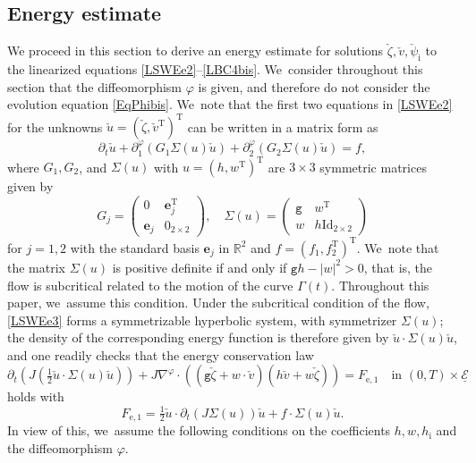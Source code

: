 \documentclass[10pt]{amsart}
\newcommand{\gr}{{\mathtt g}}
\newcommand{\R}{{\mathbb R}}
\newcommand{\dt}{\partial_t}
\newcommand{\cE}{{\mathcal E}}
\newcommand{\ul}[1]{\underline{#1}}
\newcommand{\itGamma}{\mathit{\Gamma}}
\theoremstyle{definition}
\begin{document}
\subsection{Energy estimate}
We proceed in this section to derive an energy estimate for solutions $\check{\zeta},\check{v},\check{\psi}_\mathrm{i}$ to the linearized equations
\eqref{LSWEe2}--\eqref{LBC4bis}. We~consider throughout this section that the diffeomorphism $\varphi$ is given, and therefore do not consider the evolution equation \eqref{EqPhibis}. We~note that the first two equations in \eqref{LSWEe2} for the unknowns $\check{u}=(\check{\zeta},\check{v}^\mathrm{T})^\mathrm{T}$
can be written in a matrix form as
\begin{equation}\label{LSWEe3}
\dt\check{u}+\partial_1^\varphi(G_1\Sigma(u)\check{u})+\partial_2^\varphi(G_2\Sigma(u)\check{u})=f,
\end{equation}
where $G_1,G_2$, and $\Sigma(u)$ with $u=(h,w^\mathrm{T})^\mathrm{T}$ are $3\times3$ symmetric matrices given by
\[
G_j=
\begin{pmatrix}
0 & \mathbf{e}_j^\mathrm{T} \\
\mathbf{e}_j & 0_{2\times2}
\end{pmatrix}, \quad
\Sigma(u)=
\begin{pmatrix}
\gr & w^\mathrm{T} \\
w & h\mathrm{Id}_{2\times2}
\end{pmatrix}
\]
for $j=1,2$ with the standard basis $\mathbf{e}_j$ in $\R^2$ and $f=(f_1,f_2^\mathrm{T})^\mathrm{T}$. We~note that the matrix $\Sigma(u)$ is positive definite if and only if $\gr h-|w|^2>0$, that is,
the flow is subcritical related to the motion of the curve $\itGamma(t)$.
Throughout this paper, we~assume this condition.
Under the subcritical condition of the flow, \eqref{LSWEe3} forms a symmetrizable hyperbolic system, with symmetrizer $\Sigma(u)$;
the density of the corresponding energy function is therefore given by $\check{u}\cdot\Sigma(u)\check{u}$,
and one readily checks that the energy conservation law
\begin{equation}\label{localCE}
\dt(J(\tfrac12\check{u}\cdot\Sigma(u)\check{u}))
+ J\nabla^\varphi\cdot((\gr\check{\zeta}+w\cdot\check{v})(h\check{v}+w\check{\zeta})) = F_\mathrm{e,1}
\quad\text{in } (0,T)\times\ul{\cE}
\end{equation}
holds with
\[
F_\mathrm{e,1}=\tfrac{1}{2}\check{u}\cdot\dt (J\Sigma(u))\check{u} + f\cdot \Sigma(u)\check{u}.
\]
In view of this, we~assume the following conditions on the coefficients $h,w,h_\mathrm{i}$ and the diffeomorphism $\varphi$.
\end{document}
